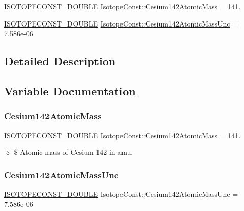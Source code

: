 \begin{DoxyCompactItemize}
\item 
\mbox{\hyperlink{group___isotope_const-_macros_ga8f45a7272ce02c0b4c65c44636ed719a}{I\+S\+O\+T\+O\+P\+E\+C\+O\+N\+S\+T\+\_\+\+D\+O\+U\+B\+LE}} \mbox{\hyperlink{group___isotope_const-_cesium-_cs142_ga4854542fe6d4338bc4e8daea97383090}{Isotope\+Const\+::\+Cesium142\+Atomic\+Mass}} = 141.
\item 
\mbox{\hyperlink{group___isotope_const-_macros_ga8f45a7272ce02c0b4c65c44636ed719a}{I\+S\+O\+T\+O\+P\+E\+C\+O\+N\+S\+T\+\_\+\+D\+O\+U\+B\+LE}} \mbox{\hyperlink{group___isotope_const-_cesium-_cs142_ga976c8c603d3a180e76d12129ab1524db}{Isotope\+Const\+::\+Cesium142\+Atomic\+Mass\+Unc}} = 7.\+586e-\/06
\end{DoxyCompactItemize}


\subsection{Detailed Description}


\subsection{Variable Documentation}
\mbox{\label{group___isotope_const-_cesium-_cs142_ga4854542fe6d4338bc4e8daea97383090}} 
\subsubsection{\texorpdfstring{Cesium142\+Atomic\+Mass}{Cesium142AtomicMass}}
{\footnotesize\ttfamily \mbox{\hyperlink{group___isotope_const-_macros_ga8f45a7272ce02c0b4c65c44636ed719a}{I\+S\+O\+T\+O\+P\+E\+C\+O\+N\+S\+T\+\_\+\+D\+O\+U\+B\+LE}} Isotope\+Const\+::\+Cesium142\+Atomic\+Mass = 141.}

\$ \$ Atomic mass of Cesium-\/142 in amu. \mbox{\label{group___isotope_const-_cesium-_cs142_ga976c8c603d3a180e76d12129ab1524db}} 
\subsubsection{\texorpdfstring{Cesium142\+Atomic\+Mass\+Unc}{Cesium142AtomicMassUnc}}
{\footnotesize\ttfamily \mbox{\hyperlink{group___isotope_const-_macros_ga8f45a7272ce02c0b4c65c44636ed719a}{I\+S\+O\+T\+O\+P\+E\+C\+O\+N\+S\+T\+\_\+\+D\+O\+U\+B\+LE}} Isotope\+Const\+::\+Cesium142\+Atomic\+Mass\+Unc = 7.\+586e-\/06}

